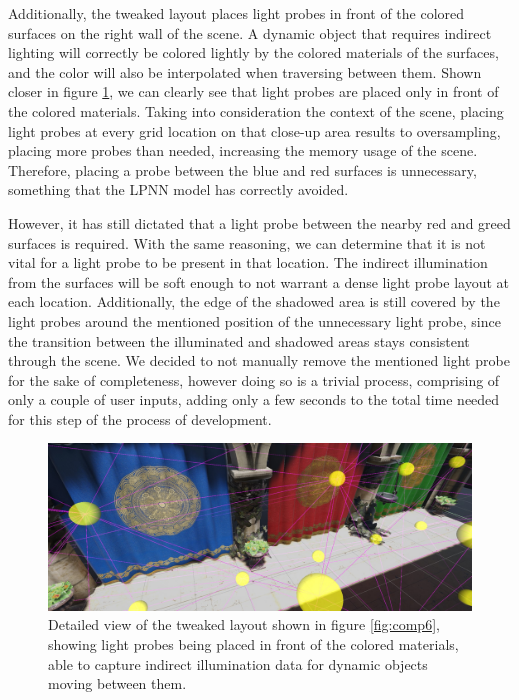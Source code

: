 Additionally, the tweaked layout places light probes in front of the colored surfaces on the right wall of the scene. A dynamic object that requires indirect lighting will correctly be colored lightly by the colored materials of the surfaces, and the color will also be interpolated when traversing between them. Shown closer in figure \ref{fig:sponza_detail}, we can clearly see that light probes are placed only in front of the colored materials. Taking into consideration the context of the scene, placing light probes at every grid location on that close-up area results to oversampling, placing more probes than needed, increasing the memory usage of the scene. Therefore, placing a probe between the blue and red surfaces is unnecessary, something that the LPNN model has correctly avoided. 

However, it has still dictated that a light probe between the nearby red and greed surfaces is required. With the same reasoning, we can determine that it is not vital for a light probe to be present in that location. The indirect illumination from the surfaces will be soft enough to not warrant a dense light probe layout at each location. Additionally, the edge of the shadowed area is still covered by the light probes around the mentioned position of the unnecessary light probe, since the transition between the illuminated and shadowed areas stays consistent through the scene. We decided to not manually remove the mentioned light probe for the sake of completeness, however doing so is a trivial process, comprising of only a couple of user inputs, adding only a few seconds to the total time needed for this step of the process of development.

\begin{figure}[H]
	\centering
	\includegraphics[width=\linewidth]{Graphics/results/sponza_0.4_2_C.jpg}
	\caption{Detailed view of the tweaked layout shown in figure \ref{fig:comp6}, showing light probes being placed in front of the colored materials, able to capture indirect illumination data for dynamic objects moving between them.}
	\label{fig:sponza_detail}
\end{figure}

